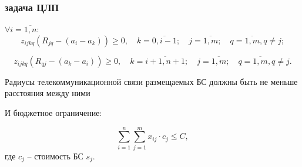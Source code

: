         


\begin{frame}
    \frametitle{задача ЦЛП}
    \begin{minipage}[t]{1\linewidth}
        \fontsize{6pt}{7.2}\selectfont
        $\forall i= \overline{1,n}$:
        \begin{equation}
          \label{eq:part3_z_ijkq_7}
          z_{ijkq}(R_{jq}-(a_i-a_k )) \geq 0, \quad k=\overline{0,i-1}; \quad j=\overline{1,m}; \quad q= \overline{1,m}, q \neq j; 
        \end{equation}
        
        \begin{equation}
          \label{eq:part3_z_ijkq_8}
          z_{ijkq} (R_{qj}-(a_k-a_i )) \geq 0, \quad k=\overline{i+1,n+1}; \quad j=\overline{1,m}; \quad q= \overline{1,m}, q \neq j.
        \end{equation}
    \medskip
    \end{minipage}
    
    \begin{minipage}[и]{0.5\linewidth}
        \fontsize{7pt}{7.2}\selectfont
        Радиусы телекоммуникационной связи размещаемых БС должны быть не меньше расстояния между ними
        \bigskip

    \end{minipage}
    \hfill
    \begin{minipage}[b]{0.47\linewidth}
        
    \end{minipage}
    \begin{minipage}[b]{0.99\linewidth}
        \fontsize{7pt}{7.2}\selectfont
        И бюджетное ограничение:

        \begin{equation}
        \label{eq:part3_cost}
        \sum\limits_{i=1}^n \sum\limits_{j=1}^m x_{ij} \cdot c_j \leq C,
        \end{equation}
        где $c_j$ -- стоимость БС $s_j$.
    \end{minipage}

\end{frame}


